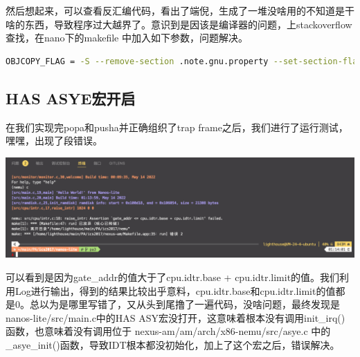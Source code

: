 \documentclass[UTF8,a4paper,10pt]{ctexart}
\begin{document}
然后想起来，可以查看反汇编代码，看出了端倪，生成了一堆没啥用的不知道是干啥的东西，导致程序过大越界了。意识到是因该是编译器的问题，上stackoverflow查找，在nano下的makefile 中加入如下参数，问题解决。
\begin{lstlisting}[language = bash]
OBJCOPY_FLAG = -S --remove-section .note.gnu.property --set-section-flags .bss=alloc,contents -O binary
\end{lstlisting}

\subsection{HAS ASYE宏开启}
在我们实现完popa和pusha并正确组织了trap frame之后，我们进行了运行测试，嘿嘿，出现了段错误。
\begin{center}
  \includegraphics*[scale = 0.3]{pic/报错2}
\end{center}
可以看到是因为gate\_addr的值大于了cpu.idtr.base + cpu.idtr.limit的值。我们利用Log进行输出，得到的结果比较出乎意料，cpu.idtr.base和cpu.idtr.limit的值都是0。总以为是哪里写错了，又从头到尾撸了一遍代码，没啥问题，最终发现是nanos-lite/src/main.c中的HAS ASY宏没打开，这意味着根本没有调用init\_irq()函数，也意味着没有调用位于 nexus-am/am/arch/x86-nemu/src/asye.c 中的\_asye\_init()函数，导致IDT根本都没初始化，加上了这个宏之后，错误解决。

























\end{document}
